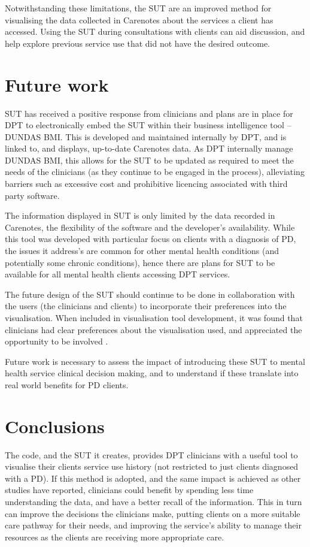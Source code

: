 \documentclass{article}
\begin{document}
Notwithstanding these limitations, the SUT are an improved method for visualising the data collected in Carenotes about the services a client has accessed. Using the SUT during consultations with clients can aid discussion, and help explore previous service use that did not have the desired outcome.

\section{Future work}

SUT has received a positive response from clinicians and plans are in place for DPT to electronically embed the SUT within their business intelligence tool – DUNDAS BMI. This is developed and maintained internally by DPT, and is linked to, and displays, up-to-date Carenotes data. As DPT internally manage DUNDAS BMI, this allows for the SUT to be updated as required to meet the needs of the clinicians (as they continue to be engaged in the process), alleviating barriers such as excessive cost \cite{Bidargaddi2018} and prohibitive licencing associated with third party software. 

The information displayed in SUT is only limited by the data recorded in Carenotes, the flexibility of the software and the developer’s availability. While this tool was developed with particular focus on clients with a diagnosis of PD, the issues it address’s are common for other mental health conditions (and potentially some chronic conditions), hence there are plans for SUT to be available for all mental health clients accessing DPT services.

The future design of the SUT should continue to be done in collaboration with the users (the clinicians and clients) to incorporate their preferences into the visualisation. When included in visualisation tool development, it was found that clinicians had clear preferences about the visualisation used, and appreciated the opportunity to be involved \cite{Gill2010}.

Future work is necessary to assess the impact of introducing these SUT to mental health service clinical decision making, and to understand if these translate into real world benefits for PD clients.

\section{Conclusions}

The code, and the SUT it creates, provides DPT clinicians with a useful tool to visualise their clients service use history (not restricted to just clients diagnosed with a PD).
If this method is adopted, and the same impact is achieved as other studies have reported, clinicians could benefit by spending less time understanding the data, and have a better recall of the information. This in turn can improve the decisions the clinicians make, putting clients on a more suitable care pathway for their needs, and improving the service’s ability to manage their resources as the clients are receiving more appropriate care.
\end{document}
